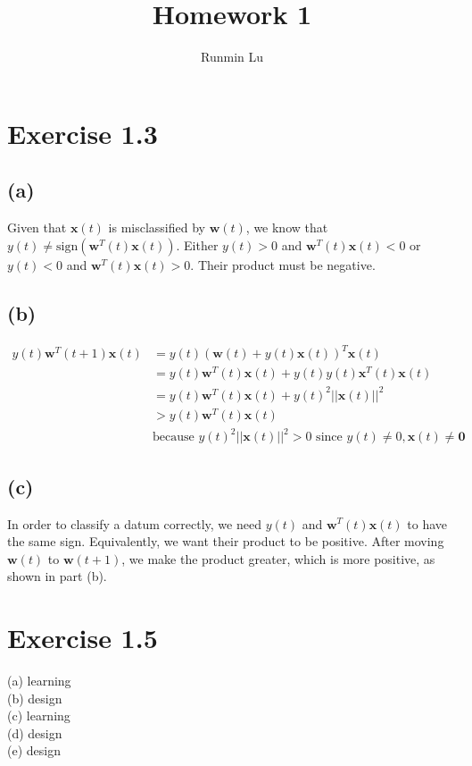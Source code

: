 \documentclass{article}
\title{Homework 1}
\author{Runmin Lu}
\begin{document}
	\maketitle
	
	\section*{Exercise 1.3}
	\subsection*{(a)}
		Given that $\mathbf{x}(t)$ is misclassified by $\mathbf{w}(t)$, we know that $y(t) \neq \text{sign}(\mathbf{w}^T(t)\mathbf{x}(t))$. Either $y(t) > 0$ and $\mathbf{w}^T(t)\mathbf{x}(t) < 0$ or $y(t) < 0$ and $\mathbf{w}^T(t)\mathbf{x}(t) > 0$. Their product must be negative.
		
	\subsection*{(b)}
		\begin{align*}
			y(t)\mathbf{w}^T(t+1)\textbf{x}(t) &= y(t)(\mathbf{w}(t) + y(t)\mathbf x(t))^T\mathbf x(t)\\
			&= y(t)\mathbf{w}^T(t)\textbf{x}(t) + y(t)y(t)\mathbf x^T(t)\mathbf x(t)\\
			&= y(t)\mathbf{w}^T(t)\textbf{x}(t) + y(t)^2||\mathbf x(t)||^2\\
			&> y(t)\mathbf{w}^T(t)\textbf{x}(t)\\
			&\text{because } y(t)^2||\mathbf x(t)||^2 > 0 \text{ since } y(t) \neq 0, \mathbf x(t) \neq \mathbf 0
		\end{align*}
		
	\subsection*{(c)}
		In order to classify a datum correctly, we need $y(t)$ and $\mathbf{w}^T(t)\textbf{x}(t)$ to have the same sign. Equivalently, we want their product to be positive. After moving $\mathbf{w}(t)$ to $\mathbf{w}(t+1)$, we make the product greater, which is more positive, as shown in part (b).
		
	\section*{Exercise 1.5}
		(a) learning\\
		(b) design\\
		(c) learning\\
		(d) design\\
		(e) design
		
\end{document}
